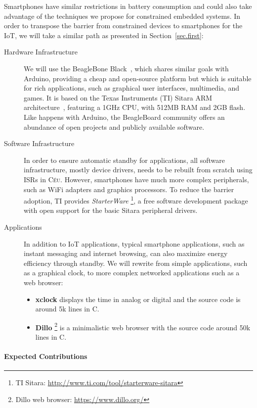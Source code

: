 \documentclass[12pt,english]{amsart}
\newcommand{\CEU}{\textsc{C\'{e}u}\xspace}
\begin{document}
Smartphones have similar restrictions in battery consumption and could also
take advantage of the techniques we propose for constrained embedded systems.
%
%
In order to transpose the barrier from constrained devices to smartphones for
the IoT, we will take a similar path as presented in Section~\ref{sec.first}:
%
\begin{description}
\item[Hardware Infrastructure]
We will use the BeagleBone Black~\cite{bbb.manual}, which shares similar goals with
Arduino, providing a cheap and open-source platform but which is suitable for rich
applications, such as graphical user interfaces, multimedia, and games.
It is based on the Texas Instruments (TI) Sitara ARM
architecture~\cite{bbb.sitara}, featuring a 1GHz CPU, with 512MB RAM and 2GB
flash.
Like happens with Arduino, the BeagleBoard community offers an abundance of
open projects and publicly available software.
\item[Software Infrastructure]
In order to ensure automatic standby for applications, all software
infrastructure, mostly device drivers, needs to be rebuilt from scratch using
ISRs in \CEU.
However, smartphones have much more complex peripherals, such as WiFi adapters
and graphics processors.
To reduce the barrier adoption,
TI provides \emph{StarterWare}%
\footnote{TI Sitara: \url{http://www.ti.com/tool/starterware-sitara}},
a free software development package with open
support for the basic Sitara peripheral drivers.
\item[Applications]
In addition to IoT applications, typical smartphone applications, such as
instant messaging and internet browsing, can also maximize energy efficiency
through standby.
We will rewrite from simple applications, such as a graphical clock, to more
complex networked applications such as a web browser:
\begin{itemize}
\item \textbf{xclock} displays the time in analog or digital and the source code is around 5k lines in C.
\item \textbf{Dillo}%
\footnote{Dillo web browser: \url{https://www.dillo.org/}}
is a minimalistic web browser with the source code around 50k lines in C.
\end{itemize}
\end{description}

\paragraph{\textbf{Expected Contributions}}
\end{document}
